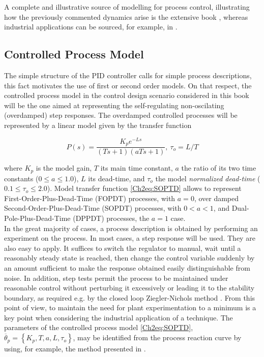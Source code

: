 A complete and illustrative source of modelling for process control, illustrating how the previously commented dynamics arise is the extensive book \citep{MarlinBook}, whereas industrial applications can be sourced, for example, in  \citep{VilanovaBook2012}.


\subsection{Controlled Process Model}
\label{sec:2.1}

The simple structure of the PID controller calls for simple process descriptions, this fact motivates the use of first or second order models. On that respect, the controlled process model in the control design scenario considered in this book will be the one aimed at representing the self-regulating non-oscilating (overdamped) step responses. The overdamped controlled processes will be represented by a linear model given by the transfer function

\begin{equation}
    P(s) = \frac{K_p e^{-Ls}}{(Ts+1)(aTs+1)}, \ \tau_o = L/T 
    \label{Ch2eq:SOPTD}
\end{equation}

\noindent where $K_p$ is the model gain, $T$ its main time constant, $a$ the ratio of its two time constants ($0 \leq a \leq 1.0$), $L$ its dead-time, and $\tau_o$ the model \emph{normalized dead-time} ($0.1 \leq \tau_o \leq 2.0$). Model transfer function \eqref{Ch2eq:SOPTD} allows to represent First-Order-Plus-Dead-Time (FOPDT) processes, with $a=0$, over damped Second-Order-Plus-Dead-Time (SOPDT) processes, with $0 < a < 1$, and Dual-Pole-Plus-Dead-Time (DPPDT) processes, the $a=1$ case.\\

In the great majority of cases, a process description is obtained by performing an experiment on the process. In most cases, a step response will be used. They are also easy to apply. It suffices to switch the regulator to manual, wait until a reasonably steady state is reached, then change the control variable suddenly by an amount sufficient to make the response obtained easily distinguishable from noise. In addition, step tests permit the process to be maintained under reasonable control without perturbing it excessively or leading it to the stability boundary, as required e.g. by the closed loop Ziegler-Nichols method \citep{astromhagglund2006}. From this point of view, to maintain the need for plant experimentation to a minimum is a key point when considering the industrial application of a technique. The parameters of the controlled process model \eqref{Ch2eq:SOPTD}, $\overline{\theta}_p = \left\{K_p, T, a, L, \tau_o \right\}$, may be identified from the process reaction curve by using, for example, the method presented in \citep{alfaro2006-1}. 



